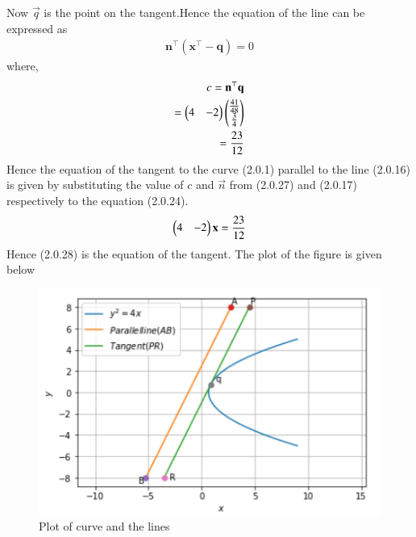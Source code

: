 \documentclass[journal,12pt,twocolumn]{IEEEtran}
\begin{document}
Now $\vec{q}$ is the point on the tangent.Hence the equation of the line can be expressed as 
\begin{align}
    \mathbf{n}^{\top}(\mathbf{x}^{\top}-\mathbf{q}) = 0
\end{align}
where,
\begin{align}
    c=\mathbf{n}^{\top}\mathbf{q}
    \\
    =\begin{pmatrix}4&-2\end{pmatrix}\begin{pmatrix}\frac{41}{48} \\ \frac{3}{4}\end{pmatrix} 
    \\
    = \frac{23}{12}
\end{align}
Hence the equation of the tangent to the curve (2.0.1) parallel to the line (2.0.16) is given by substituting the value of $c$ and $\vec{n}$ from (2.0.27) and (2.0.17) respectively to the equation (2.0.24). 
\begin{align}
    \begin{pmatrix}4&-2\end{pmatrix}\mathbf{x}=\frac{23}{12}
\end{align}
Hence (2.0.28) is the equation of the tangent.
The plot of the figure is given below

\begin{figure}[ht]
\centering
\includegraphics[width=\columnwidth]{Parabola.PNG}
\caption{Plot of curve and the lines}
\label{Plot of curve and the lines}
\end{figure}
\end{document}
